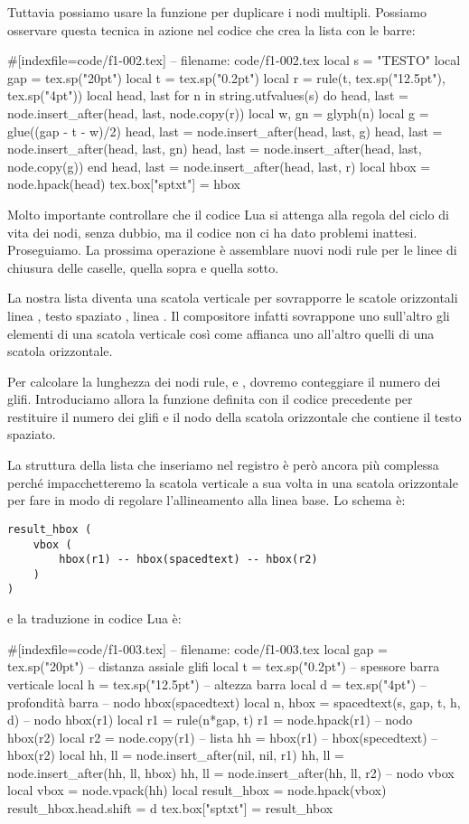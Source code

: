 Tuttavia possiamo usare la funzione  per
duplicare i nodi multipli. Possiamo osservare questa tecnica in azione nel
codice che crea la lista con le barre:
\begin{lines}
#[indexfile=code/f1-002.tex]
-- filename: code/f1-002.tex
local s = "TESTO"
local gap = tex.sp("20pt")
local t = tex.sp("0.2pt")
local r = rule(t, tex.sp("12.5pt"), tex.sp("4pt"))
local head, last
for n in string.utfvalues(s) do
    head, last = node.insert_after(head, last, node.copy(r))
    local w, gn = glyph(n)
    local g = glue((gap - t - w)/2)
    head, last = node.insert_after(head, last, g)
    head, last = node.insert_after(head, last, gn)
    head, last = node.insert_after(head, last, node.copy(g))
end
head, last = node.insert_after(head, last, r)
local hbox = node.hpack(head)
tex.box["sptxt"] = hbox
\end{lines}

Molto importante controllare che il codice Lua si attenga alla regola del ciclo
di vita dei nodi, senza dubbio, ma il codice non ci ha dato problemi inattesi.
Proseguiamo. La prossima operazione è assemblare nuovi nodi rule per le linee di
chiusura delle caselle, quella sopra e quella sotto.

La nostra lista diventa una scatola verticale per sovrapporre le scatole
orizzontali linea , testo spaziato , linea
. Il compositore infatti sovrappone uno sull'altro gli elementi di
una scatola verticale così come affianca uno all'altro quelli di una scatola
orizzontale.

Per calcolare la lunghezza dei nodi rule,  e , dovremo
conteggiare il numero dei glifi. Introduciamo allora la funzione 
definita con il codice precedente per restituire il numero dei glifi e il nodo
della scatola orizzontale che contiene il testo spaziato.

La struttura della lista che inseriamo nel registro è però ancora più complessa
perché impacchetteremo la scatola verticale a sua volta in una scatola
orizzontale per fare in modo di regolare l'allineamento alla linea base. Lo
schema è:
\begin{Verbatim}[numbers=none]
result_hbox (
    vbox (
        hbox(r1) -- hbox(spacedtext) -- hbox(r2)
    )
)
\end{Verbatim}

e la traduzione in codice Lua è:
\begin{lines}
#[indexfile=code/f1-003.tex]
-- filename: code/f1-003.tex
local gap = tex.sp("20pt") -- distanza assiale glifi
local t = tex.sp("0.2pt")  -- spessore barra verticale
local h = tex.sp("12.5pt") -- altezza barra
local d = tex.sp("4pt")    -- profondità barra
-- nodo hbox(spacedtext)
local n, hbox = spacedtext(s, gap, t, h, d)
-- nodo hbox(r1)
local r1 = rule(n*gap, t)
r1 = node.hpack(r1)
-- nodo hbox(r2)
local r2 = node.copy(r1)
-- lista hh = hbox(r1) -- hbox(specedtext) -- hbox(r2)
local hh, ll = node.insert_after(nil, nil, r1)
hh, ll = node.insert_after(hh, ll, hbox)
hh, ll = node.insert_after(hh, ll, r2)
-- nodo vbox
local vbox = node.vpack(hh)
local result_hbox = node.hpack(vbox)
result_hbox.head.shift = d
tex.box["sptxt"] = result_hbox
\end{lines}

